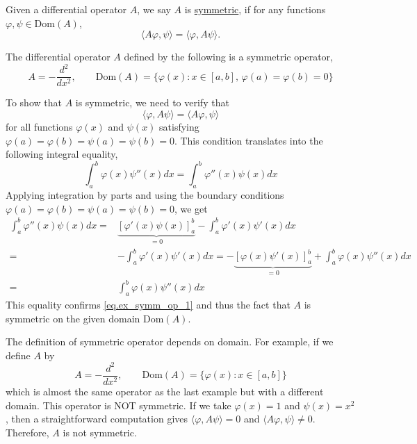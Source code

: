 \begin{definition} Given a differential operator $A$, we say $A$ is \underline{symmetric}, if for any functions $\varphi, \psi\in \mathrm{Dom}(A)$,
\begin{equation}\label{eq.symm_operator}
    \langle A\varphi, \psi\rangle = \langle \varphi, A\psi\rangle.
\end{equation}
    
\end{definition}

\begin{example}[]\label{ex.symm_op}
The differential operator $A$ defined by the following is a symmetric operator,
\begin{equation}
A = -\frac{d^2}{dx^2},\qquad \mathrm{Dom}(A) = \{\varphi(x): x\in [a, b],\,\varphi(a) = \varphi(b) = 0\}
\end{equation}

To show that $A$ is symmetric, we need to verify that
\begin{equation}\label{eq.ex_symm_op_1}
\langle \varphi, A\psi \rangle = \langle A\varphi, \psi \rangle
\end{equation}
for all functions $\varphi(x)$ and $\psi(x)$ satisfying $\varphi(a) = \varphi(b) = \psi(a) = \psi(b) = 0$. This condition translates into the following integral equality,
\begin{equation}
\int_a^b \varphi(x) \psi''(x) dx = \int_a^b \varphi''(x) \psi(x) dx
\end{equation}
Applying integration by parts and using the boundary conditions $\varphi(a) = \varphi(b) = \psi(a) = \psi(b) = 0$, we get
\begin{equation}
\begin{split}
    \int_a^b \varphi''(x) \psi(x) dx =& \underbrace{\left[\varphi'(x) \psi(x)\right]_a^b}_{ = 0} - \int_a^b \varphi'(x) \psi'(x) dx 
    \\
    =& - \int_a^b \varphi'(x) \psi'(x) dx = -\underbrace{\left[\varphi(x) \psi'(x)\right]_a^b}_{ = 0} + \int_a^b \varphi(x) \psi''(x) dx
    \\
    =& \int_a^b \varphi(x) \psi''(x) dx
\end{split}
\end{equation}
This equality confirms \eqref{eq.ex_symm_op_1} and thus the fact that $A$ is symmetric on the given domain $\mathrm{Dom}(A)$.
\end{example}

\begin{example}
    The definition of symmetric operator depends on domain. For example, if we define $A$ by 
    \begin{equation}
        A = -\frac{d^2}{dx^2},\qquad \mathrm{Dom}(A) = \{\varphi(x): x\in [a, b]\}
    \end{equation}
    which is almost the same operator as the last example but with a different domain. This operator is NOT symmetric. If we take $\varphi(x) = 1$ and $\psi(x) = x^2$, then a straightforward computation gives $\langle \varphi, A\psi \rangle = 0$ and  $\langle A\varphi, \psi \rangle \neq 0$. Therefore, $A$ is not symmetric.
\end{example}

